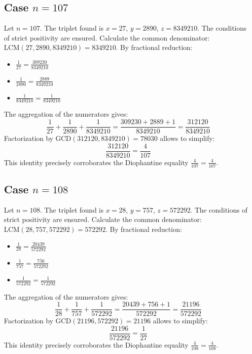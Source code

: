 \documentclass[11pt,a4paper]{article}
\begin{document}
\subsection{Case $n = 107$}
Let $n = 107$. The triplet found is $x = 27$, $y = 2890$, $z = 8349210$.
The conditions of strict positivity are ensured.
Calculate the common denominator: $\text{LCM}(27, 2890, 8349210) = 8349210$.
By fractional reduction:
\begin{itemize}
    \item $\frac{1}{27} = \frac{309230}{8349210}$
    \item $\frac{1}{2890} = \frac{2889}{8349210}$
    \item $\frac{1}{8349210} = \frac{1}{8349210}$
\end{itemize}
The aggregation of the numerators gives:
$$ \frac{1}{27} + \frac{1}{2890} + \frac{1}{8349210} = \frac{309230 + 2889 + 1}{8349210} = \frac{312120}{8349210} $$
Factorization by $\text{GCD}(312120, 8349210) = 78030$ allows to simplify:
$$ \frac{312120}{8349210} = \frac{4}{107} $$
This identity precisely corroborates the Diophantine equality $\frac{4}{107} = \frac{4}{107}$.

\subsection{Case $n = 108$}
Let $n = 108$. The triplet found is $x = 28$, $y = 757$, $z = 572292$.
The conditions of strict positivity are ensured.
Calculate the common denominator: $\text{LCM}(28, 757, 572292) = 572292$.
By fractional reduction:
\begin{itemize}
    \item $\frac{1}{28} = \frac{20439}{572292}$
    \item $\frac{1}{757} = \frac{756}{572292}$
    \item $\frac{1}{572292} = \frac{1}{572292}$
\end{itemize}
The aggregation of the numerators gives:
$$ \frac{1}{28} + \frac{1}{757} + \frac{1}{572292} = \frac{20439 + 756 + 1}{572292} = \frac{21196}{572292} $$
Factorization by $\text{GCD}(21196, 572292) = 21196$ allows to simplify:
$$ \frac{21196}{572292} = \frac{1}{27} $$
This identity precisely corroborates the Diophantine equality $\frac{4}{108} = \frac{4}{108}$.
\end{document}
